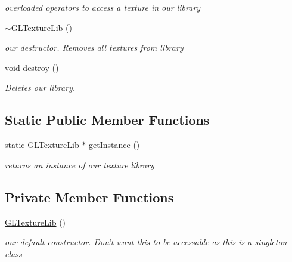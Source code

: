 \begin{DoxyCompactItemize}
\begin{DoxyCompactList}\small\item\em overloaded operators to access a texture in our library \end{DoxyCompactList}\item 
\hypertarget{class_g_l_texture_lib_aca4b2bd67c1af5b5c1ea304fe2622eac}{\hyperlink{class_g_l_texture_lib_aca4b2bd67c1af5b5c1ea304fe2622eac}{$\sim$\-G\-L\-Texture\-Lib} ()}\label{class_g_l_texture_lib_aca4b2bd67c1af5b5c1ea304fe2622eac}

\begin{DoxyCompactList}\small\item\em our destructor. Removes all textures from library \end{DoxyCompactList}\item 
\hypertarget{class_g_l_texture_lib_a49ba9410297b15f1f2988369853c108f}{void \hyperlink{class_g_l_texture_lib_a49ba9410297b15f1f2988369853c108f}{destroy} ()}\label{class_g_l_texture_lib_a49ba9410297b15f1f2988369853c108f}

\begin{DoxyCompactList}\small\item\em Deletes our library. \end{DoxyCompactList}\end{DoxyCompactItemize}
\subsection*{Static Public Member Functions}
\begin{DoxyCompactItemize}
\item 
\hypertarget{class_g_l_texture_lib_aedb1360fe37f369eb290f773dbada309}{static \hyperlink{class_g_l_texture_lib}{G\-L\-Texture\-Lib} $\ast$ \hyperlink{class_g_l_texture_lib_aedb1360fe37f369eb290f773dbada309}{get\-Instance} ()}\label{class_g_l_texture_lib_aedb1360fe37f369eb290f773dbada309}

\begin{DoxyCompactList}\small\item\em returns an instance of our texture library \end{DoxyCompactList}\end{DoxyCompactItemize}
\subsection*{Private Member Functions}
\begin{DoxyCompactItemize}
\item 
\hypertarget{class_g_l_texture_lib_a7ac1f52801de2e75472f3bd495c40185}{\hyperlink{class_g_l_texture_lib_a7ac1f52801de2e75472f3bd495c40185}{G\-L\-Texture\-Lib} ()}\label{class_g_l_texture_lib_a7ac1f52801de2e75472f3bd495c40185}

\begin{DoxyCompactList}\small\item\em our default constructor. Don't want this to be accessable as this is a singleton class \end{DoxyCompactList}\end{DoxyCompactItemize}
